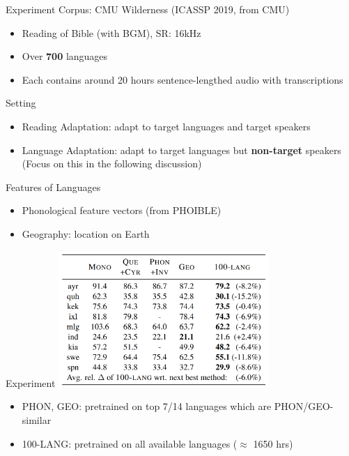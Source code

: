 \documentclass{beamer}
\begin{document}
\begin{frame}{Experiment}
  Corpus: CMU Wilderness (ICASSP 2019, from CMU)
  \begin{itemize}
    \item Reading of Bible (with BGM), SR: 16kHz
    \item Over \textbf{700} languages
    \item Each contains around 20 hours sentence-lengthed audio with transcriptions
  \end{itemize}
  Setting
  \begin{itemize}
    \item Reading Adaptation: adapt to target languages and target speakers
    \item Language Adaptation: adapt to target languages but \textbf{non-target} speakers\\
      (Focus on this in the following discussion)
  \end{itemize}
\end{frame}

\begin{frame}{Features of Languages}
  \begin{itemize}
    \item Phonological feature vectors (from PHOIBLE)
    \item Geography: location on Earth
  \end{itemize}
\end{frame}

\begin{frame}{Experiment}
  \center \includegraphics[width=0.6\textwidth]{fig/p2-result.png}

  \begin{itemize}
    \item PHON, GEO: pretrained on top 7/14 languages which are PHON/GEO-similar
    \item 100-LANG: pretrained on all available languages ($\approx$ 1650 hrs)
  \end{itemize}
\end{frame}
\end{document}
